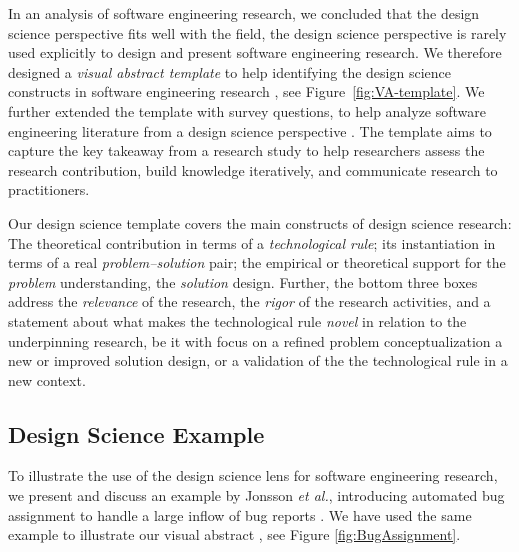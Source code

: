 \documentclass[graybox]{svmult}
\begin{document}
In an analysis of software engineering research, we concluded that the design science perspective fits well with the field, the design science perspective is rarely used explicitly to design and present software engineering research. We therefore designed a \emph{visual abstract template} to help identifying the design science constructs in software engineering research \cite{StoreyESEM17}, see Figure~\ref{fig:VA-template}. We further extended the template with survey questions, to help analyze software engineering literature from a design science perspective \cite{Engstrom19arxiv}. The template aims to capture the key takeaway from a research study to help researchers assess the research contribution, build knowledge iteratively, and communicate research to practitioners. %

Our design science template covers the main constructs of design science research: The theoretical contribution in terms of a \emph{technological rule}; its instantiation in terms of a real \emph{problem--solution} pair;  the empirical or theoretical support for the \emph{problem} understanding, the \emph{solution} design. Further, the bottom three boxes address the \emph{relevance} of the research, the \emph{rigor} of the research activities,  and a statement about what makes the technological rule \emph{novel} in relation to the underpinning research, be it with focus on a refined problem conceptualization a new or improved solution design, or a validation of the the technological rule in a new context. 




\subsection{Design Science Example}
\label{sec:examples}
To illustrate the use of the design science lens for software engineering research, we present and discuss an example by Jonsson \emph{et al.}, introducing automated bug assignment to handle a large inflow of bug reports \cite{JonssonBug15}. We have used the same example to illustrate our visual abstract \cite{StoreyESEM17}, see Figure \ref{fig:BugAssignment}.
\end{document}
